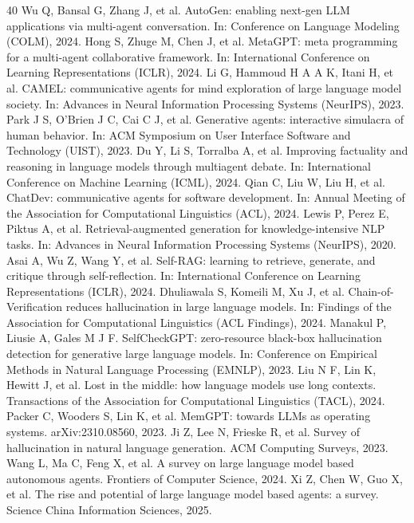 \documentclass[journal,10pt,a4paper]{IEEEtran}
\begin{document}
\begin{thebibliography}{40}
 Wu Q, Bansal G, Zhang J, et al. AutoGen: enabling next-gen LLM applications via multi-agent conversation. In: Conference on Language Modeling (COLM), 2024.
 Hong S, Zhuge M, Chen J, et al. MetaGPT: meta programming for a multi-agent collaborative framework. In: International Conference on Learning Representations (ICLR), 2024.
 Li G, Hammoud H A A K, Itani H, et al. CAMEL: communicative agents for mind exploration of large language model society. In: Advances in Neural Information Processing Systems (NeurIPS), 2023.
 Park J S, O'Brien J C, Cai C J, et al. Generative agents: interactive simulacra of human behavior. In: ACM Symposium on User Interface Software and Technology (UIST), 2023.
 Du Y, Li S, Torralba A, et al. Improving factuality and reasoning in language models through multiagent debate. In: International Conference on Machine Learning (ICML), 2024.
 Qian C, Liu W, Liu H, et al. ChatDev: communicative agents for software development. In: Annual Meeting of the Association for Computational Linguistics (ACL), 2024.
 Lewis P, Perez E, Piktus A, et al. Retrieval-augmented generation for knowledge-intensive NLP tasks. In: Advances in Neural Information Processing Systems (NeurIPS), 2020.
 Asai A, Wu Z, Wang Y, et al. Self-RAG: learning to retrieve, generate, and critique through self-reflection. In: International Conference on Learning Representations (ICLR), 2024.
 Dhuliawala S, Komeili M, Xu J, et al. Chain-of-Verification reduces hallucination in large language models. In: Findings of the Association for Computational Linguistics (ACL Findings), 2024.
 Manakul P, Liusie A, Gales M J F. SelfCheckGPT: zero-resource black-box hallucination detection for generative large language models. In: Conference on Empirical Methods in Natural Language Processing (EMNLP), 2023.
 Liu N F, Lin K, Hewitt J, et al. Lost in the middle: how language models use long contexts. Transactions of the Association for Computational Linguistics (TACL), 2024.
 Packer C, Wooders S, Lin K, et al. MemGPT: towards LLMs as operating systems. arXiv:2310.08560, 2023.
 Ji Z, Lee N, Frieske R, et al. Survey of hallucination in natural language generation. ACM Computing Surveys, 2023.
 Wang L, Ma C, Feng X, et al. A survey on large language model based autonomous agents. Frontiers of Computer Science, 2024.
 Xi Z, Chen W, Guo X, et al. The rise and potential of large language model based agents: a survey. Science China Information Sciences, 2025.

\end{thebibliography}
\end{document}
